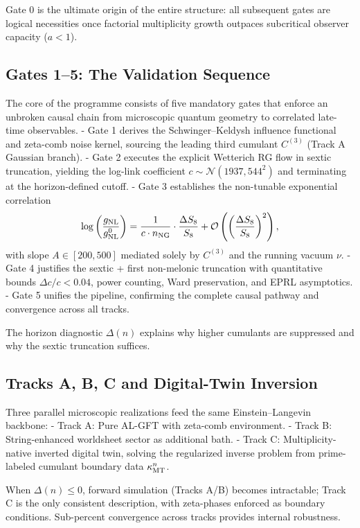\documentclass[11pt,a4paper,twoside]{article}
\begin{document}
Gate 0 is the ultimate origin of the entire structure: all subsequent gates are logical necessities once factorial multiplicity growth outpaces subcritical observer capacity ($a < 1$).

\subsection{Gates 1--5: The Validation Sequence}
The core of the programme consists of five mandatory gates that enforce an unbroken causal chain from microscopic quantum geometry to correlated late-time observables.  
- Gate 1 derives the Schwinger–Keldysh influence functional and zeta-comb noise kernel, sourcing the leading third cumulant $C^{(3)}$ (Track A Gaussian branch).  
- Gate 2 executes the explicit Wetterich RG flow in sextic truncation, yielding the log-link coefficient $c \sim \mathcal{N}(1937, 544^2)$ and terminating at the horizon-defined cutoff.  
- Gate 3 establishes the non-tunable exponential correlation  
  \[
  \log\left(\frac{g_{\rm NL}}{g_{\rm NL}^{0}}\right) = \frac{1}{c \cdot n_{\rm NG}} \cdot \frac{\Delta S_8}{S_8} + \mathcal{O}\left(\left(\frac{\Delta S_8}{S_8}\right)^2\right),
  \]  
  with slope $A \in [200, 500]$ mediated solely by $C^{(3)}$ and the running vacuum $\nu$.  
- Gate 4 justifies the sextic + first non-melonic truncation with quantitative bounds $\Delta c/c < 0.04$, power counting, Ward preservation, and EPRL asymptotics.  
- Gate 5 unifies the pipeline, confirming the complete causal pathway and convergence across all tracks.  

The horizon diagnostic $\Delta(n)$ explains why higher cumulants are suppressed and why the sextic truncation suffices.

\subsection{Tracks A, B, C and Digital-Twin Inversion}
Three parallel microscopic realizations feed the same Einstein–Langevin backbone:  
- Track A: Pure AL-GFT with zeta-comb environment.  
- Track B: String-enhanced worldsheet sector as additional bath.  
- Track C: Multiplicity-native inverted digital twin, solving the regularized inverse problem from prime-labeled cumulant boundary data $\kappa_{\rm MT}^n$.  

When $\Delta(n) \le 0$, forward simulation (Tracks A/B) becomes intractable; Track C is the only consistent description, with zeta-phases enforced as boundary conditions. Sub-percent convergence across tracks provides internal robustness.
\end{document}

